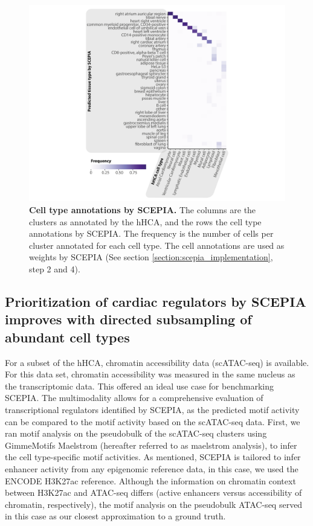 \begin{figure}
    \centering
    \includegraphics[width=1.0\linewidth]{ch.scepia/imgs/SCEPIA Annotation Heatmap All Cells 40deg Rotated Figure 4_noDend_Centered.png}
    \caption{\textbf{Cell type annotations by  SCEPIA.} The columns are the clusters as annotated by the hHCA, and the rows the cell type annotations by SCEPIA. The frequency is the number of cells per cluster annotated for each cell type. The cell annotations are used as weights by SCEPIA (See section \ref{section:scepia_implementation}, step 2 and 4). }
    \label{fig:scepia_annohm}
\end{figure}

\subsection{Prioritization of cardiac regulators by SCEPIA improves with directed subsampling of abundant cell types}

For a subset of the hHCA, chromatin accessibility data (scATAC-seq) is available. For this data set, chromatin accessibility was measured in the same nucleus as the transcriptomic data. This offered an ideal use case for benchmarking SCEPIA. The multimodality allows for a comprehensive evaluation of transcriptional regulators identified by SCEPIA, as the predicted motif activity can be compared to the motif activity based on the scATAC-seq data. First, we ran motif analysis on the pseudobulk of the scATAC-seq clusters using GimmeMotifs Maelstrom\cite{Bruse_2018} (hereafter referred to as maelstrom analysis), to infer the cell type-specific motif activities. As mentioned, SCEPIA is tailored to infer enhancer activity from any epigenomic reference data, in this case, we used the ENCODE H3K27ac reference. Although the information on chromatin context between H3K27ac and ATAC-seq differs (active enhancers versus accessibility of chromatin, respectively), the motif analysis on the pseudobulk ATAC-seq served in this case as our closest approximation to a ground truth. 

